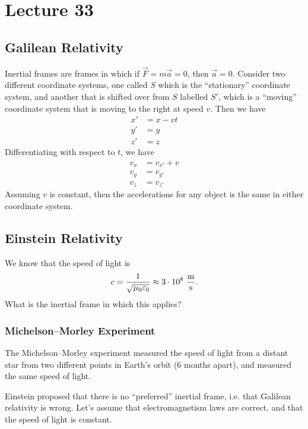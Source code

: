 \documentclass[class=article, crop=false]{standalone}
\begin{document}
  \section{Lecture 33}
  \subsection{Galilean Relativity}
  Inertial frames are frames in which if $\vec{F} = m\vec{a} = 0$, then $\vec{a} = 0$. Consider two different coordinate systems, one called $S$ which is the ``stationary'' coordinate system, and another that is shifted over from $S$ labelled $S'$, which is a ``moving'' coordinate system that is moving to the right at speed $v$. Then we have
  \begin{align*}
    x' &= x - vt \\
    y' &= y \\
    z' &= z
  \end{align*}
  Differentiating with respect to $t$, we have
  \begin{align*}
    v_x &= v_{x'} + v \\
    v_y &= v_{y'} \\
    v_z &= v_{z'}
  \end{align*}
  Assuming $v$ is constant, then the accelerations for any object is the same in either coordinate system.
  \subsection{Einstein Relativity}
  We know that the speed of light is
  \[
    c = \frac{1}{\sqrt{\mu_0\eps_0}} \approx 3\cdot 10^8\ \frac{\mathrm{m}}{\mathrm{s}}.
  \]
  What is the inertial frame in which this applies?
  \subsubsection{Michelson--Morley Experiment}
  The Michelson--Morley experiment measured the speed of light from a distant star from two different points in Earth's orbit (6 months apart), and measured the same speed of light. \par
  Einstein proposed that there is no ``preferred'' inertial frame, i.e. that Galilean relativity is wrong. Let's assume that electromagnetism laws are correct, and that the speed of light is constant.
\end{document}
